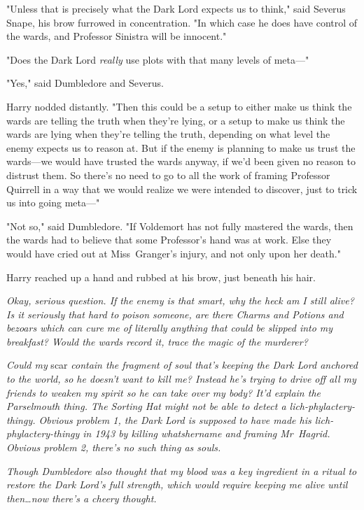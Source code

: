 "Unless that is precisely what the Dark Lord expects us to think," said Severus
Snape, his brow furrowed in concentration. "In which case he does have control
of the wards, and Professor Sinistra will be innocent."

"Does the Dark Lord \emph{really} use plots with that many levels of meta—"

"Yes," said Dumbledore and Severus.

Harry nodded distantly. "Then this could be a setup to either make us think the
wards are telling the truth when they're lying, or a setup to make us think the
wards are lying when they're telling the truth, depending on what level the
enemy expects us to reason at. But if the enemy is planning to make us trust
the wards—we would have trusted the wards anyway, if we'd been given no
reason to distrust them. So there's no need to go to all the work of framing
Professor Quirrell in a way that we would realize we were intended to discover,
just to trick us into going meta—"

"Not so," said Dumbledore. "If Voldemort has not fully mastered the wards, then
the wards had to believe that some Professor's hand was at work. Else they
would have cried out at Miss~Granger's injury, and not only upon her death."

Harry reached up a hand and rubbed at his brow, just beneath his hair.

\emph{Okay, serious question. If the enemy is that smart, why the heck am I
still alive? Is it seriously that hard to poison someone, are there Charms and
Potions and bezoars which can cure me of literally anything that could be
slipped into my breakfast? Would the wards record it, trace the magic of the
murderer?}

\emph{Could my} scar \emph{contain the fragment of soul that's keeping the Dark
Lord anchored to the world, so he doesn't want to kill me? Instead he's trying
to drive off all my friends to weaken my spirit so he can take over my body?
It'd explain the Parselmouth thing. The Sorting Hat might not be able to detect
a lich-phylactery-thingy. Obvious problem 1, the Dark Lord is supposed to have
made his lich-phylactery-thingy in 1943 by killing whatshername and framing
Mr~Hagrid. Obvious problem 2, there's no such thing as souls.}

\emph{Though Dumbledore also thought that my blood was a key ingredient in a
ritual to restore the Dark Lord's full strength, which would require keeping me
alive until then…now there's a cheery thought.}

